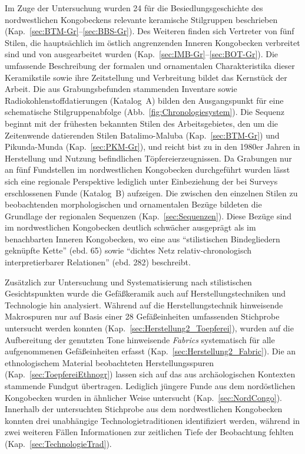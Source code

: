 Im Zuge der Untersuchung wurden 24 für die Besiedlungsgeschichte des nordwestlichen Kongobeckens relevante keramische Stilgruppen beschrieben (Kap.~\ref{sec:BTM-Gr}--\ref{sec:BBS-Gr}). Des Weiteren finden sich Vertreter von fünf Stilen, die hauptsächlich im östlich angrenzenden Inneren Kongobecken verbreitet sind und von \textcite{Wotzka.1995} ausgearbeitet wurden (Kap.~\ref{sec:IMB-Gr}--\ref{sec:BOT-Gr}). Die umfassende Beschreibung der formalen und ornamentalen Charakteristika dieser Keramikstile sowie ihre Zeitstellung und Verbreitung bildet das Kernstück der Arbeit. Die aus Grabungsbefunden stammenden Inventare sowie Radiokohlenstoffdatierungen (Katalog~A) bilden den Ausgangspunkt für eine schematische Stilgruppenabfolge (Abb.~\ref{fig:Chronologiesystem}). Die Sequenz beginnt mit der frühesten bekannten Stilen des Arbeitsgebietes, den um die Zeitenwende datierenden Stilen Batalimo-Maluba (Kap.~\ref{sec:BTM-Gr}) und Pikunda-Munda (Kap.~\ref{sec:PKM-Gr}), und reicht bist zu in den 1980er Jahren in Herstellung und Nutzung befindlichen Töpfereierzeugnissen. Da Grabungen nur an fünf Fundstellen im nordwestlichen Kongobecken durchgeführt wurden lässt sich eine regionale Perspektive lediglich unter Einbeziehung der bei Surveys erschlossenen Funde (Katalog~B) aufzeigen. Die zwischen den einzelnen Stilen zu beobachtenden morphologischen und ornamentalen Bezüge bildeten die Grundlage der regionalen Sequenzen (Kap.~\ref{sec:Sequenzen}). Diese Bezüge sind im nordwestlichen Kongobecken deutlich schwächer ausgeprägt als im benachbarten Inneren Kongobecken, wo \textcite{Wotzka.1995} eine aus \enquote{stilistischen Bindegliedern geknüpfte Kette} (ebd. 65) sowie \enquote{dichtes Netz relativ-chronologisch interpretierbarer Relationen} (ebd. 282) beschreibt.

Zusätzlich zur Untersuchung und Systematisierung nach stilistischen Gesichtspunkten wurde die Gefäßkeramik auch auf Herstellungstechniken und Technologie hin analysiert. Während auf die Herstellungstechnik hinweisende Makrospuren nur auf Basis einer 28 Gefäßeinheiten umfassenden Stichprobe untersucht werden konnten (Kap.~\ref{sec:Herstellung2_Toepferei}), wurden auf die Aufbereitung der genutzten Tone hinweisende \textit{Fabrics} systematisch für alle aufgenommenen Gefäßeinheiten erfasst (Kap.~\ref{sec:Herstellung2_Fabric}). Die an ethnologischem Material beobachteten Herstellungsspuren (Kap.~\ref{sec:ToepfereiEthnogr}) lassen sich auf das aus archäologischen Kontexten stammende Fundgut übertragen. Lediglich jüngere Funde aus dem nordöstlichen Kongobecken wurden in ähnlicher Weise untersucht (Kap.~\ref{sec:NordCongo}). Innerhalb der untersuchten Stichprobe aus dem nordwestlichen Kongobecken konnten drei unabhängige Technologietraditionen identifiziert werden, während in zwei weiteren Fällen Informationen zur zeitlichen Tiefe der Beobachtung fehlten (Kap.~\ref{sec:TechnologieTrad}).

